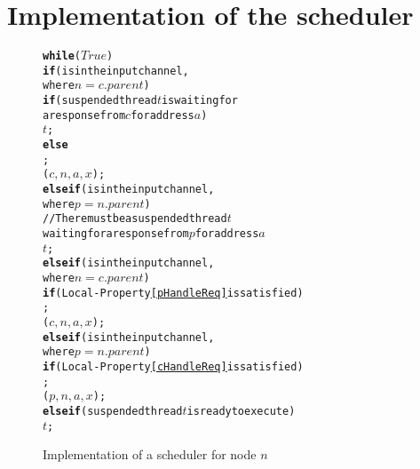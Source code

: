 \section{Implementation of the scheduler}
\label{sec:scheduler}

\newcommand{\lWhile}{\textbf{while}}
\newcommand{\lIf}{\textbf{if}}
\newcommand{\lElsIf}{\textbf{else if}}
\newcommand{\lElse}{\textbf{else}}


\begin{figure}
\small
\begin{boxedminipage}{\linewidth}
\begin{alltt}
\normalfont
\lWhile{} (\(True\)) \bopen
      \lIf ( is in the input channel,
            where \(n = c.parent\)) \bopen
            \lIf (suspended thread \(t\) is waiting for 
                 a response from \(c\) for address \(a\)) \bopen
                   \resume{} \(t\);
            \bclose \lElse \bopen
                   \receive{} ;
                   \start{} \dRespL(\(c, n, a, x\));
            \bclose
      \bclose \lElsIf ( is in the input channel,
            where \(p = n.parent\)) \bopen
                   // There must be a suspended thread \(t\)
                   waiting for a response from \(p\) for address \(a\)
                   \resume{} \(t\);
            \bclose
      \bclose \lElsIf ( is in the input channel,
                     where \(n = c.parent\)) \bopen
             \lIf (Local-Property \ref{pHandleReq} is satisfied) \bopen
                   \receive{} ;
                   \start{} \uReq(\(c, n, a, x\));
             \bclose
      \bclose \lElsIf ( is in the input channel,
                  where \(p = n.parent\)) \bopen
             \lIf (Local-Property \ref{cHandleReq} is satisfied) \bopen
                   \receive{} ;
                   \start{} \dReq(\(p, n, a, x\));
             \bclose
      \bclose \lElsIf (suspended thread \(t\) is ready to execute) 
             \resume{} \(t\);
\bclose
\end{alltt}
\end{boxedminipage}
\caption{Implementation of a scheduler for node $n$}
\end{figure}
